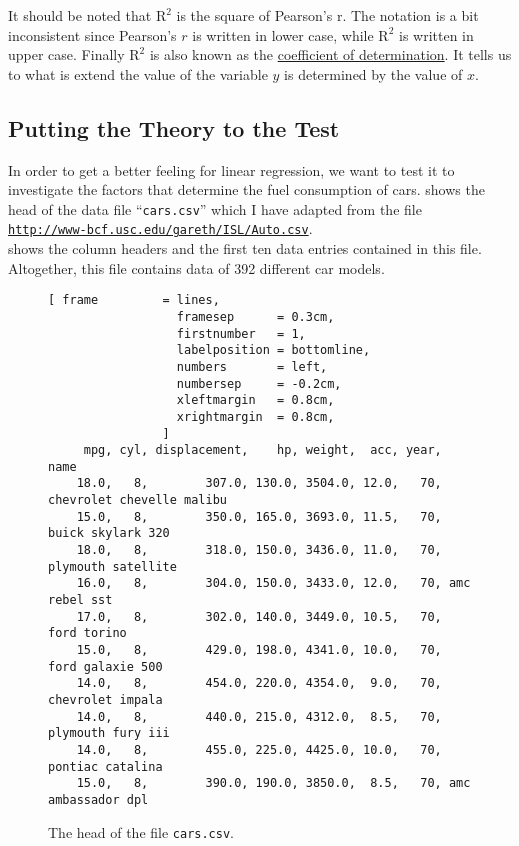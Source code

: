 It should be noted that $\mathrm{R}^2$ is the square of Pearson's \textrm{r}.  The notation is a bit
inconsistent since Pearson's $r$ is written in lower case, while $\mathrm{R}^2$ is written in upper
case.  Finally $\mathrm{R}^2$ is also known as the 
\href{https://en.wikipedia.org/wiki/Coefficient_of_determination}{coefficient of determination}.  It tells us
to what is extend the value of the variable $y$ is determined by the value of $x$.


\subsection{Putting the Theory to the Test}
In order to get a better feeling for linear regression, we want to test it to investigate the factors that
determine the fuel consumption of cars.   shows the head of the data file ``\texttt{cars.csv}''
which I have adapted from the file
\\[0.2cm]
\hspace*{1.3cm}
\href{http://www-bcf.usc.edu/~gareth/ISL/Auto.csv}{\texttt{http://www-bcf.usc.edu/gareth/ISL/Auto.csv}}.
\\[0.2cm]
 shows the column headers and the first ten data entries contained in this file.  
Altogether, this file contains data of 392 different car models.

\begin{figure}[!ht]
\centering
\begin{Verbatim}[ frame         = lines, 
                  framesep      = 0.3cm, 
                  firstnumber   = 1,
                  labelposition = bottomline,
                  numbers       = left,
                  numbersep     = -0.2cm,
                  xleftmargin   = 0.8cm,
                  xrightmargin  = 0.8cm,
                ]
     mpg, cyl, displacement,    hp, weight,  acc, year, name
    18.0,   8,        307.0, 130.0, 3504.0, 12.0,   70, chevrolet chevelle malibu
    15.0,   8,        350.0, 165.0, 3693.0, 11.5,   70, buick skylark 320
    18.0,   8,        318.0, 150.0, 3436.0, 11.0,   70, plymouth satellite
    16.0,   8,        304.0, 150.0, 3433.0, 12.0,   70, amc rebel sst
    17.0,   8,        302.0, 140.0, 3449.0, 10.5,   70, ford torino
    15.0,   8,        429.0, 198.0, 4341.0, 10.0,   70, ford galaxie 500
    14.0,   8,        454.0, 220.0, 4354.0,  9.0,   70, chevrolet impala
    14.0,   8,        440.0, 215.0, 4312.0,  8.5,   70, plymouth fury iii
    14.0,   8,        455.0, 225.0, 4425.0, 10.0,   70, pontiac catalina
    15.0,   8,        390.0, 190.0, 3850.0,  8.5,   70, amc ambassador dpl
\end{Verbatim}
\vspace*{-0.3cm}
\caption{The head of the file \texttt{cars.csv}.}
\label{fig:cars.csv}
\end{figure}

